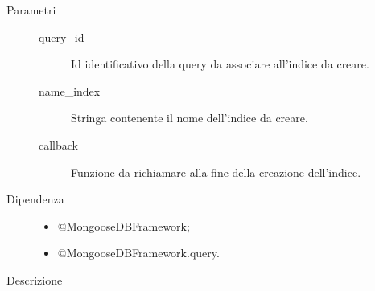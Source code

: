 \begin{description}
\begin{mldescription}
    
    \begin{description}
	 \item[Parametri]
	  \begin{description}
	   \item[query\_id]
	   Id identificativo della query da associare all'indice da creare.
	   \item[name\_index]
	   Stringa contenente il nome dell'indice da creare.
	   \item[callback]
	   Funzione da richiamare alla fine della creazione dell'indice.
	  \end{description}
	 \item[Dipendenza]
	  \begin{itemize}
	   \item @MongooseDBFramework;	   
	   \item @MongooseDBFramework.query.
	  \end{itemize}
	 \item[Descrizione]
	 
	\end{description}	    
    
  \end{mldescription}
\end{description}

